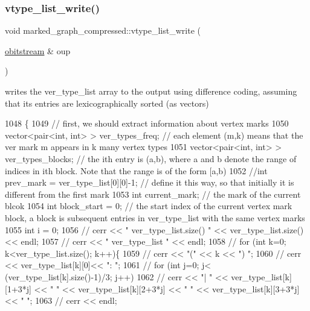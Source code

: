 \subsubsection{\texorpdfstring{vtype\+\_\+list\+\_\+write()}{vtype\_list\_write()}}
{\footnotesize\ttfamily void marked\+\_\+graph\+\_\+compressed\+::vtype\+\_\+list\+\_\+write (\begin{DoxyParamCaption}\item[{\hyperlink{classobitstream}{obitstream} \&}]{oup }\end{DoxyParamCaption})}



writes the ver\+\_\+type\+\_\+list array to the output using difference coding, assuming that its entries are lexicographically sorted (as vectors) 


\begin{DoxyCode}
1048                                                              \{
1049   \textcolor{comment}{// first, we should extract information about vertex marks}
1050   vector<pair<int, int> > ver\_types\_freq; \textcolor{comment}{// each element (m,k) means that the ver mark m appears in k many
       vertex types}
1051   vector<pair<int, int> > ver\_types\_blocks; \textcolor{comment}{// the ith entry is (a,b), where a and b denote the range of
       indices in ith block. Note that the range is of the form [a,b)}
1052   \textcolor{comment}{//int prev\_mark = ver\_type\_list[0][0]-1; // define it this way, so that initially it is different from
       the first mark}
1053   \textcolor{keywordtype}{int} current\_mark; \textcolor{comment}{// the mark of the current blcok}
1054   \textcolor{keywordtype}{int} block\_start = 0; \textcolor{comment}{// the start index of the current vertex mark block, a block is subsequent entries
       in ver\_type\_list with the same vertex marks}
1055   \textcolor{keywordtype}{int} i = 0;
1056   \textcolor{comment}{// cerr << " ver\_type\_list.size() " << ver\_type\_list.size() << endl;}
1057   \textcolor{comment}{// cerr << " ver\_type\_list " << endl;}
1058   \textcolor{comment}{// for (int k=0; k<ver\_type\_list.size(); k++)\{}
1059   \textcolor{comment}{//   cerr << "(" << k << ") ";}
1060   \textcolor{comment}{//   cerr << ver\_type\_list[k][0]<< ": ";}
1061   \textcolor{comment}{//   for (int j=0; j< (ver\_type\_list[k].size()-1)/3; j++)}
1062   \textcolor{comment}{//     cerr << "| " << ver\_type\_list[k][1+3*j] << " " << ver\_type\_list[k][2+3*j] << " " <<
       ver\_type\_list[k][3+3*j] << " ";}
1063   \textcolor{comment}{//   cerr << endl;}

\end{DoxyCode}
